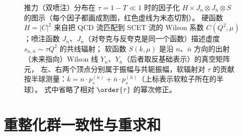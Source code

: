 \begin{figure}[htbp]
\caption{推力（双喷注）分布在 $\tau=1-T\ll1$ 时的因子化 $H\times J_n\otimes J_{\bar n}\otimes S$ 的图示（每个因子都画成割图，红色虚线为末态切割）。
硬函数 $H=|C|^2$ 来自把 QCD 流匹配到 SCET 流的 Wilson 系数 $C(Q^2,\mu)$；喷注函数 $J_n$、$J_{\bar n}$（对夸克与反夸克是同一个函数）描述虚度 $s_{n,\bar n}\sim\tau Q^2$ 的共线辐射；
软函数 $S(k,\mu)$ 是沿 $n$、$\bar n$ 方向的出射（未来指向）Wilson 线 $Y_n$、$Y_{\bar n}$（后者取反基础表示）的真空矩阵元，
左、右两个顶点分别属于振幅与共轭振幅，软辐射对 $\tau$ 的贡献按半球测量：$k=n\cdot p_{s}^{(n)}+\bar n\cdot p_{s}^{(\bar n)}$（上标表示软粒子所在的半球）。
式中省略了相对 $\order{\tau}$ 的幂次修正。}
\label{fig:dijet-factorization}
\end{figure}

\section{重整化群一致性与重求和}\label{sec:scet-rg}

